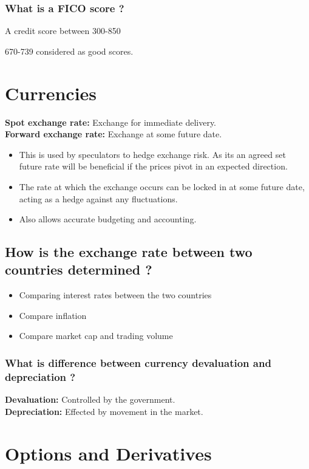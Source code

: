 \documentclass[11pt]{scrartcl} %
\begin{document}
\subsubsection{What is a FICO score ?}

A credit score between 300-850

670-739 considered as good scores.

\section{Currencies}

\textbf{Spot exchange rate:} Exchange for immediate delivery. \\
\textbf{Forward exchange rate:} Exchange at some future date.

\begin{itemize}
	\item This is used by speculators to hedge exchange risk. As its an agreed set future rate will be beneficial if the prices pivot in an expected direction.
	\item The rate at which the exchange occurs can be locked in at some future date, acting as a hedge against any fluctuations.
	\item Also allows accurate budgeting and accounting.
\end{itemize}

\subsection{How is the exchange rate between two countries determined ?}

\begin{itemize}
	\item Comparing interest rates between the two countries
	\item Compare inflation
	\item Compare market cap and trading volume
\end{itemize}

\subsubsection{What is difference between currency devaluation and depreciation ?}

\textbf{Devaluation:} Controlled by the government.\\
\textbf{Depreciation:} Effected by movement in the market.

\section{Options and Derivatives}
\end{document}
